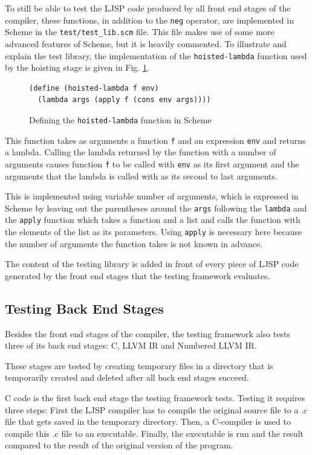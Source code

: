 \documentclass[11pt]{report}
\begin{document}
To still be able to test the LJSP code produced by all front end stages of the compiler, these functions, in addition to the \texttt{neg} operator, are implemented in Scheme in the \texttt{test/test_lib.scm} file. This file makes use of some more advanced features of Scheme, but it is heavily commented. To illustrate and explain the test library, the implementation of the \texttt{hoisted-lambda} function used by the hoisting stage is given in Fig. \ref{testing1}.

\begin{figure}[ht]
\begin{lstlisting}
(define (hoisted-lambda f env) 
  (lambda args (apply f (cons env args))))
\end{lstlisting}
\caption{Defining the \texttt{hoisted-lambda} function in Scheme}
\label{testing1}
\end{figure}

This function takes as arguments a function \texttt{f} and an expression \texttt{env} and returns a lambda. Calling the lambda returned by the function with a number of arguments causes function \texttt{f} to be called with \texttt{env} as its first argument and the arguments that the lambda is called with as its second to last arguments.

This is implemented using variable number of arguments, which is expressed in Scheme by leaving out the parentheses around the \texttt{args} following the \texttt{lambda} and the \texttt{apply} function which takes a function and a list and calls the function with the elements of the list as its parameters. Using \texttt{apply} is necessary here because the number of arguments the function takes is not known in advance.

The content of the testing library is added in front of every piece of LJSP code generated by the front end stages that the testing framework evaluates.

\subsection{Testing Back End Stages}

Besides the front end stages of the compiler, the testing framework also tests three of its back end stages: C, LLVM IR and Numbered LLVM IR.

These stages are tested by creating temporary files in a directory that is temporarily created and deleted after all back end stages succeed.

C code is the first back end stage the testing framework tests. Testing it requires three steps: First the LJSP compiler has to compile the original source file to a .c file that gets saved in the temporary directory. Then, a C-compiler is used to compile this .c file to an executable. Finally, the executable is run and the result compared to the result of the original version of the program.
\end{document}
